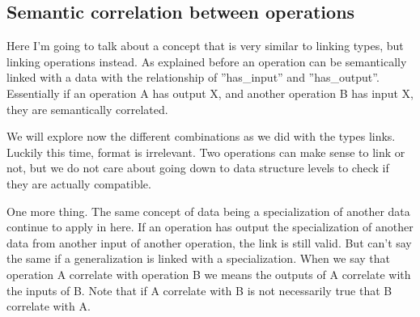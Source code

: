 \documentclass[a4paper,10pt]{article}
\begin{document}
  \subsection{Semantic correlation between operations}
  \label{sec:semanticCorrelation}

  Here I'm going to talk about a concept that is very similar to linking types, but linking operations instead. As explained before an operation can be semantically linked with a data with the relationship of ''has\_input'' and ''has\_output''. Essentially if an operation A has output X, and another operation B has input X, they are semantically correlated.\vspace{3 mm}

  We will explore now the different combinations as we did with the types links. Luckily this time, format is irrelevant. Two operations can make sense to link or not, but we do not care about going down to data structure levels to check if they are actually compatible.\vspace{3 mm}

  One more thing. The same concept of data being a specialization of another data continue to apply in here. If an operation has output the specialization of another data from another input of another operation, the link is still valid. But can't say the same if a generalization is linked with a specialization. When we say that operation A correlate with operation B we means the outputs of A correlate with the inputs of B. Note that if A correlate with B is not necessarily true that B correlate with A.\vspace{3 mm}
\end{document}

